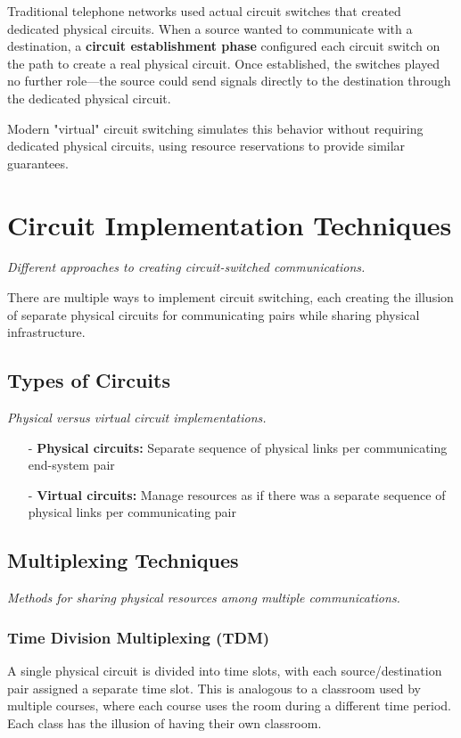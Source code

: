 \documentclass[../../compsys.tex]{subfiles}
\begin{document}
Traditional telephone networks used actual circuit switches that created dedicated physical circuits. When a source wanted to communicate with a destination, a \textbf{circuit establishment phase} configured each circuit switch on the path to create a real physical circuit. Once established, the switches played no further role—the source could send signals directly to the destination through the dedicated physical circuit.

Modern "virtual" circuit switching simulates this behavior without requiring dedicated physical circuits, using resource reservations to provide similar guarantees.
\newpage
\section{Circuit Implementation Techniques}
\textit{Different approaches to creating circuit-switched communications.}

There are multiple ways to implement circuit switching, each creating the illusion of separate physical circuits for communicating pairs while sharing physical infrastructure.

\subsection{Types of Circuits}
\textit{Physical versus virtual circuit implementations.}

\begin{itemize}
  \item[-] \textbf{Physical circuits:} Separate sequence of physical links per communicating end-system pair
  \item[-] \textbf{Virtual circuits:} Manage resources as if there was a separate sequence of physical links per communicating pair
\end{itemize}

\subsection{Multiplexing Techniques}
\textit{Methods for sharing physical resources among multiple communications.}

\subsubsection{Time Division Multiplexing (TDM)}
A single physical circuit is divided into time slots, with each source/destination pair assigned a separate time slot. This is analogous to a classroom used by multiple courses, where each course uses the room during a different time period. Each class has the illusion of having their own classroom.
\end{document}
